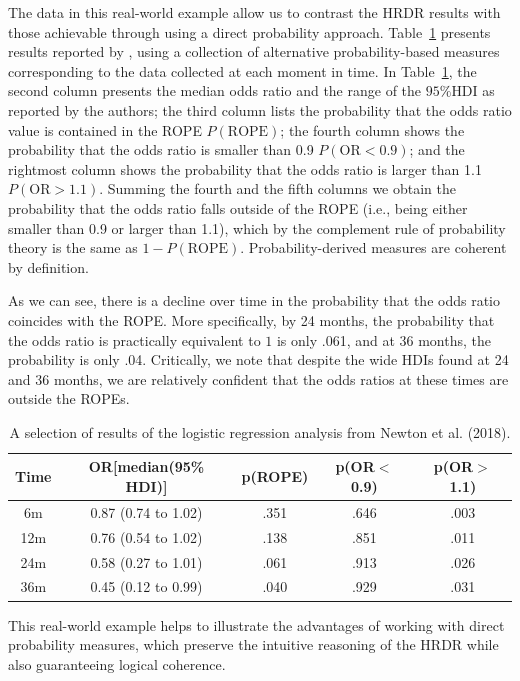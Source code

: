 \documentclass[9pt,twocolumn,twoside]{cidlab-draft}\templatetype{cidlab-invited}
\newcommand{\hdr}{HRDR}
\newcommand{\HDI}{\text{HDI}}
\begin{document}
The data in this real-world example allow us to contrast the \hdr{} results with those achievable through using a direct probability approach.  Table~\ref{tab:newton} presents results reported by \citeauthor[their Table A2]{newton2018}, using a collection of alternative probability-based measures corresponding to the data collected at each moment in time. 
%
In Table~\ref{tab:newton}, the second column presents the median odds ratio and the range of the $95\% \HDI$ as reported by the authors; the third column lists the probability that the odds ratio value is contained in the ROPE $P(\text{ROPE})$; the fourth column shows the probability that the odds ratio is smaller than 0.9 $P(\text{OR}<0.9)$; and the rightmost column shows the probability that the odds ratio is larger than 1.1 $P(\text{OR}>1.1)$. Summing the fourth and the fifth columns we obtain the probability that the odds ratio falls outside of the ROPE (i.e., being either smaller than 0.9 or larger than 1.1), which by the complement rule of probability theory is the same as $1-P(\text{ROPE})$. Probability-derived measures are coherent by definition. 

As we can see, there is a decline over time in the probability that the odds ratio coincides with the ROPE. More specifically, by 24 months, the probability that the odds ratio is practically equivalent to $1$ is only .061, and at 36 months, the probability is only .04. Critically, we note that despite the wide HDIs found at 24 and 36 months, we are relatively confident that the odds ratios at these times are outside the ROPEs.


\begin{table}
\caption{A selection of results of the logistic regression analysis from Newton et al. (2018).}\label{tab:newton}
\begin{tabular}{ccccc}\hline
    Time & OR[median(95\% HDI)] & p(ROPE) & p(OR$<$0.9) & p(OR$>$1.1)  \\\hline
   6m  & 0.87 (0.74 to 1.02) & .351 & .646 & .003\\
   12m & 0.76 (0.54 to 1.02) & .138 & .851 & .011\\
   24m & 0.58 (0.27 to 1.01) & .061 & .913 & .026\\
   36m & 0.45 (0.12 to 0.99) & .040 & .929 & .031\\\hline
\end{tabular}
\end{table}

This real-world example helps to illustrate the advantages of working with direct probability measures, which preserve the intuitive reasoning of the \hdr{} while also guaranteeing logical coherence.
 
\end{document}
